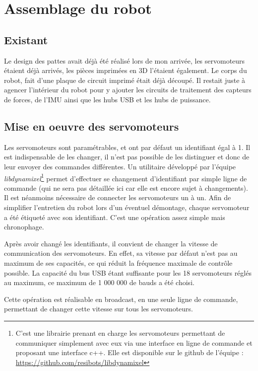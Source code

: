 \documentclass{tnreport}
\begin{document}
\section{Assemblage du robot}\label{lb:assemblage}
\subsection{Existant}
Le design des pattes avait déjà été réalisé lors de mon arrivée, les servomoteurs étaient déjà arrivés, les pièces imprimées en 3D l'étaient également. Le corps du robot, fait d'une plaque de circuit imprimé était déjà découpé. Il restait juste à agencer l'intérieur du robot pour y ajouter les circuits de traitement des capteurs de forces, de l'IMU ainsi que les hubs \gls{USB} et les hubs de puissance. 

\subsection{Mise en oeuvre des servomoteurs}
Les servomoteurs sont paramétrables, et ont par défaut un identifiant égal à 1. Il est indispensable de les changer, il n'est pas possible de les distinguer et donc de leur envoyer des commandes différentes. Un utilitaire développé par l'équipe \textit{libdynamixel}\footnote{C'est une librairie prenant en charge les servomoteurs permettant de communiquer simplement avec eux via une interface en ligne de commande et proposant une interface c++. Elle est disponible sur le github de l'équipe : \url{https://github.com/resibots/libdynamixel}} permet d'effectuer se changement d'identifiant par simple ligne de commande (qui ne sera pas détaillée ici car elle est encore sujet à changements). Il est néanmoins nécessaire de connecter les servomoteurs un à un. Afin de simplifier l'entretien du robot lors d'un éventuel démontage, chaque servomoteur a été étiqueté avec son identifiant. C'est une opération assez simple mais chronophage. 

Après avoir changé les identifiants, il convient de changer la vitesse de communication des servomoteurs. En effet, sa vitesse par défaut n'est pas au maximum de ses capacités, ce qui réduit la fréquence maximale de contrôle possible. La capacité du bus USB étant suffisante pour les 18 servomoteurs réglés au maximum, ce maximum de 1 000 000 de bauds a été choisi.

Cette opération est réalisable en broadcast, en une seule ligne de commande, permettant de changer cette vitesse sur tous les servomoteurs. 
\end{document}
